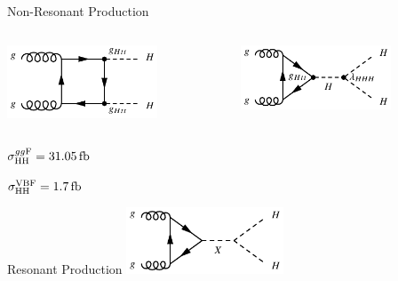 \documentclass[11pt, xcolor={dvipsnames}, aspectratio=169]{beamer}
\begin{document}
\begin{frame}{Non-Resonant \HH Production}
  \begin{columns}
    \centering

    \includegraphics[width=0.7\textwidth]{feynman_graphs/di_higgs_box}

    \centering

    \includegraphics[width=0.7\textwidth]{feynman_graphs/di_higgs_triangle}
  \end{columns}


  $\sigma_{\HH}^{gg\text{F}} = \SI{31.05}{\femto\barn}$

  $\sigma_{\HH}^{\text{VBF}} = \SI{1.7}{\femto\barn}$
\end{frame}


\begin{frame}{Resonant \HH Production}
  \includegraphics[width=0.35\textwidth]{feynman_graphs/di_higgs_resonant}
\end{frame}

\end{document}
